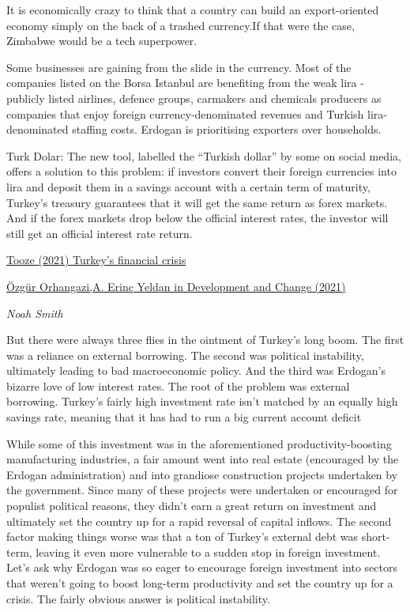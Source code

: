 \documentclass[
]{book}
\begin{document}
It is economically crazy to think that a country can build an export-oriented economy simply on the back of a trashed currency.If that were the case, Zimbabwe would be a tech superpower.

Some businesses are gaining from the slide in the currency. Most of the companies listed on the Borsa Istanbul are benefiting from the weak lira - publicly listed airlines, defence groups, carmakers and chemicals producers as companies that enjoy foreign currency-denominated revenues and Turkish lira-denominated staffing costs. Erdogan is prioritising exporters over households.

Turk Dolar: The new tool, labelled the ``Turkish dollar'' by some on social media, offers a solution to this problem: if investors convert their foreign currencies into lira and deposit them in a savings account with a certain term of maturity, Turkey's treasury guarantees that it will get the same return as forex markets. And if the forex markets drop below the official interest rates, the investor will still get an official interest rate return.

\href{https://adamtooze.substack.com/p/chartbook-63-turkeys-financial-crisis}{Tooze (2021) Turkey's financial crisis}

\href{https://onlinelibrary.wiley.com/doi/full/10.1111/dech.12644}{Özgür Orhangazi,A. Erinç Yeldan in Development and Change (2021)}

\emph{Noah Smith}

But there were always three flies in the ointment of Turkey's long boom. The first was a reliance on external borrowing. The second was political instability, ultimately leading to bad macroeconomic policy. And the third was Erdogan's bizarre love of low interest rates.
The root of the problem was external borrowing. Turkey's fairly high investment rate isn't matched by an equally high savings rate, meaning that it has had to run a big current account deficit

While some of this investment was in the aforementioned productivity-boosting manufacturing industries, a fair amount went into real estate (encouraged by the Erdogan administration) and into grandiose construction projects undertaken by the government. Since many of these projects were undertaken or encouraged for populist political reasons, they didn't earn a great return on investment and ultimately set the country up for a rapid reversal of capital inflows. The second factor making things worse was that a ton of Turkey's external debt was short-term, leaving it even more vulnerable to a sudden stop in foreign investment.
Let's ask why Erdogan was so eager to encourage foreign investment into sectors that weren't going to boost long-term productivity and set the country up for a crisis. The fairly obvious answer is political instability.
\end{document}
